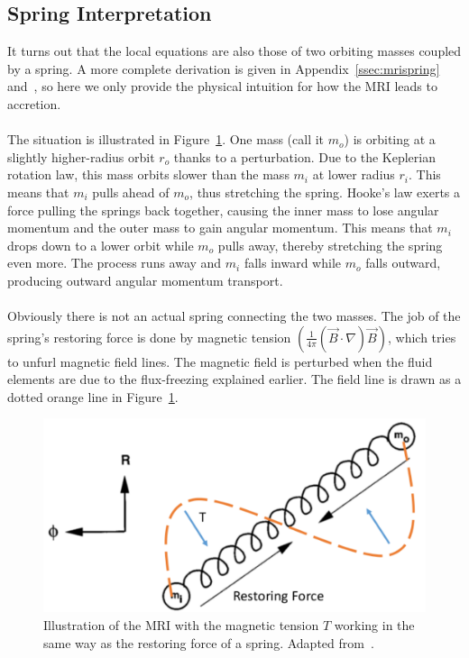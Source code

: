 \subsection{Spring Interpretation}
It turns out that the local equations are also those of two orbiting masses coupled by a spring. A more complete derivation is given in Appendix~\ref{ssec:mrispring} and~\citet{BH1998}, so here we only provide the physical intuition for how the MRI leads to accretion. \\
\\
The situation is illustrated in Figure~\ref{fig:springs}. One mass (call it $m_o$) is orbiting at a slightly higher-radius orbit $r_o$ thanks to a perturbation. Due to the Keplerian rotation law, this mass orbits slower than the mass $m_i$ at lower radius $r_i$. This means that $m_i$ pulls ahead of $m_o$, thus stretching the spring. Hooke's law exerts a force pulling the springs back together, causing the inner mass to lose angular momentum and the outer mass to gain angular momentum. This means that $m_i$ drops down to a lower orbit while $m_o$ pulls away, thereby stretching the spring even more. The process runs away and $m_i$ falls inward while $m_o$ falls outward, producing outward angular momentum transport. \\
\\
Obviously there is not an actual spring connecting the two masses. The job of the spring's restoring force is done by magnetic tension $\left(\frac{1}{4\pi}(\vec B\cdot\nabla)\vec B\right)$, which tries to unfurl magnetic field lines. The magnetic field is perturbed when the fluid elements are due to the flux-freezing explained earlier. The field line is drawn as a dotted orange line in Figure~\ref{fig:springs}.
\begin{figure}
  \begin{center}  
    \includegraphics[width=.8\textwidth, angle=0.]{img/mriSpring.pdf}
  \end{center}
  \caption{Illustration of the MRI with the magnetic tension $T$ working in the same way as the restoring force of a spring. Adapted from~\citet{BH1998}.}
  \label{fig:springs}
\end{figure}


